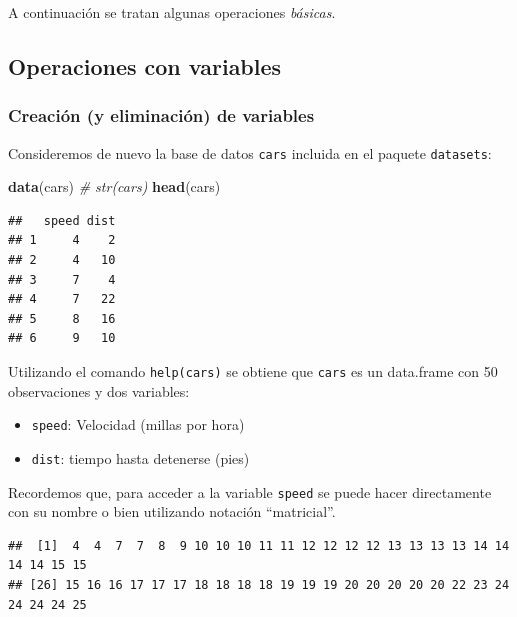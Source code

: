 \documentclass[
]{book}
\newenvironment{Shaded}{\begin{snugshade}}{\end{snugshade}}
\newcommand{\CommentTok}[1]{\textcolor[rgb]{0.56,0.35,0.01}{\textit{#1}}}
\newcommand{\FunctionTok}[1]{\textcolor[rgb]{0.13,0.29,0.53}{\textbf{#1}}}
\newcommand{\NormalTok}[1]{#1}
\newcommand{\SpecialCharTok}[1]{\textcolor[rgb]{0.81,0.36,0.00}{\textbf{#1}}}
\begin{document}
A continuación se tratan algunas operaciones \emph{básicas}.

\subsection{Operaciones con variables}\label{operaciones-con-variables}

\subsubsection{Creación (y eliminación) de variables}\label{creaciuxf3n-y-eliminaciuxf3n-de-variables}

Consideremos de nuevo la
base de datos \texttt{cars} incluida en el paquete \texttt{datasets}:

\begin{Shaded}
\begin{Highlighting}[]
\FunctionTok{data}\NormalTok{(cars)}
\CommentTok{\# str(cars)}
\FunctionTok{head}\NormalTok{(cars)}
\end{Highlighting}
\end{Shaded}

\begin{verbatim}
##   speed dist
## 1     4    2
## 2     4   10
## 3     7    4
## 4     7   22
## 5     8   16
## 6     9   10
\end{verbatim}

Utilizando el comando \texttt{help(cars)}
se obtiene que \texttt{cars} es un data.frame con 50 observaciones y dos
variables:

\begin{itemize}
\item
  \texttt{speed}: Velocidad (millas por hora)
\item
  \texttt{dist}: tiempo hasta detenerse (pies)
\end{itemize}

Recordemos que, para acceder a la variable \texttt{speed} se puede
hacer directamente con su nombre o bien utilizando notación
``matricial''.

\begin{Shaded}
\end{Shaded}

\begin{verbatim}
##  [1]  4  4  7  7  8  9 10 10 10 11 11 12 12 12 12 13 13 13 13 14 14 14 14 15 15
## [26] 15 16 16 17 17 17 18 18 18 18 19 19 19 20 20 20 20 20 22 23 24 24 24 24 25
\end{verbatim}
\end{document}

